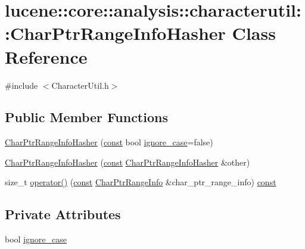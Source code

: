 \hypertarget{classlucene_1_1core_1_1analysis_1_1characterutil_1_1CharPtrRangeInfoHasher}{}\section{lucene\+:\+:core\+:\+:analysis\+:\+:characterutil\+:\+:Char\+Ptr\+Range\+Info\+Hasher Class Reference}
\label{classlucene_1_1core_1_1analysis_1_1characterutil_1_1CharPtrRangeInfoHasher}


{\ttfamily \#include $<$Character\+Util.\+h$>$}

\subsection*{Public Member Functions}
\begin{DoxyCompactItemize}
\item 
\mbox{\hyperlink{classlucene_1_1core_1_1analysis_1_1characterutil_1_1CharPtrRangeInfoHasher_a71f2afabf27326e4001429bfb58047fd}{Char\+Ptr\+Range\+Info\+Hasher}} (\mbox{\hyperlink{ZlibCrc32_8h_a2c212835823e3c54a8ab6d95c652660e}{const}} bool \mbox{\hyperlink{classlucene_1_1core_1_1analysis_1_1characterutil_1_1CharPtrRangeInfoHasher_aa4cf1eca81aa2b19e03c9a2560df0899}{ignore\+\_\+case}}=false)
\item 
\mbox{\hyperlink{classlucene_1_1core_1_1analysis_1_1characterutil_1_1CharPtrRangeInfoHasher_a7427a4eabe1dd1c10cb327509d4595fd}{Char\+Ptr\+Range\+Info\+Hasher}} (\mbox{\hyperlink{ZlibCrc32_8h_a2c212835823e3c54a8ab6d95c652660e}{const}} \mbox{\hyperlink{classlucene_1_1core_1_1analysis_1_1characterutil_1_1CharPtrRangeInfoHasher}{Char\+Ptr\+Range\+Info\+Hasher}} \&other)
\item 
size\+\_\+t \mbox{\hyperlink{classlucene_1_1core_1_1analysis_1_1characterutil_1_1CharPtrRangeInfoHasher_a2118b191b9a974e05872a5b3a562802d}{operator()}} (\mbox{\hyperlink{ZlibCrc32_8h_a2c212835823e3c54a8ab6d95c652660e}{const}} \mbox{\hyperlink{classlucene_1_1core_1_1analysis_1_1characterutil_1_1CharPtrRangeInfo}{Char\+Ptr\+Range\+Info}} \&char\+\_\+ptr\+\_\+range\+\_\+info) \mbox{\hyperlink{ZlibCrc32_8h_a2c212835823e3c54a8ab6d95c652660e}{const}}
\end{DoxyCompactItemize}
\subsection*{Private Attributes}
\begin{DoxyCompactItemize}
\item 
bool \mbox{\hyperlink{classlucene_1_1core_1_1analysis_1_1characterutil_1_1CharPtrRangeInfoHasher_aa4cf1eca81aa2b19e03c9a2560df0899}{ignore\+\_\+case}}
\end{DoxyCompactItemize}


